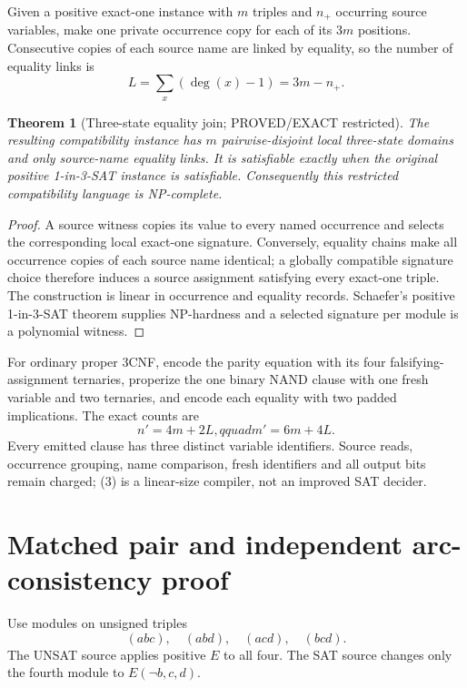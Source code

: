 \documentclass[11pt]{article}
\newtheorem{theorem}{Theorem}
\begin{document}
Given a positive exact-one instance with $m$ triples and $n_+$ occurring
source variables, make one private occurrence copy for each of its $3m$
positions.  Consecutive copies of each source name are linked by equality,
so the number of equality links is
\[
 L=\sum_x(\deg(x)-1)=3m-n_+.                                       \tag{2}
\]

\begin{theorem}[Three-state equality join; PROVED/EXACT restricted]
The resulting compatibility instance has $m$ pairwise-disjoint local
three-state domains and only source-name equality links.  It is satisfiable
exactly when the original positive 1-in-3-SAT instance is satisfiable.
Consequently this restricted compatibility language is NP-complete.
\end{theorem}
\begin{proof}
A source witness copies its value to every named occurrence and selects the
corresponding local exact-one signature.  Conversely, equality chains make
all occurrence copies of each source name identical; a globally compatible
signature choice therefore induces a source assignment satisfying every
exact-one triple.  The construction is linear in occurrence and equality
records.  Schaefer's positive 1-in-3-SAT theorem supplies NP-hardness and a
selected signature per module is a polynomial witness.
\end{proof}

For ordinary proper 3CNF, encode the parity equation with its four
falsifying-assignment ternaries, properize the one binary NAND clause with
one fresh variable and two ternaries, and encode each equality with two
padded implications.  The exact counts are
\[
 n'=4m+2L,qquad m'=6m+4L.                                          \tag{3}
\]
Every emitted clause has three distinct variable identifiers.  Source reads,
occurrence grouping, name comparison, fresh identifiers and all output bits
remain charged; (3) is a linear-size compiler, not an improved SAT decider.

\section{Matched pair and independent arc-consistency proof}
Use modules on unsigned triples
\[
 (abc),\quad(abd),\quad(acd),\quad(bcd).
\]
The UNSAT source applies positive $E$ to all four.  The SAT source changes
only the fourth module to $E(\neg b,c,d)$.
\end{document}
